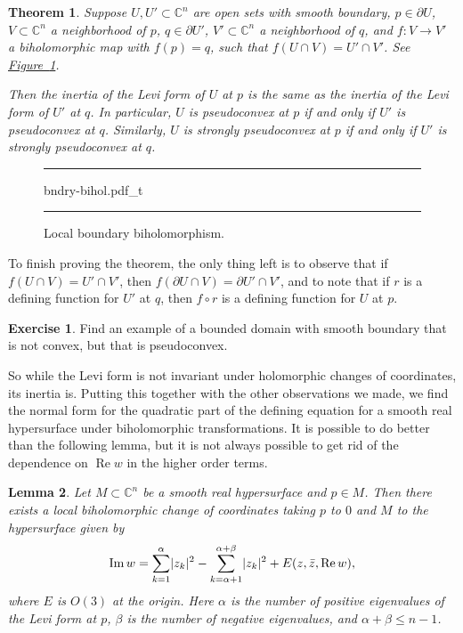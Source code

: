 \documentclass[12pt,openany]{book}
\newcommand{\avoidbreak}{\postdisplaypenalty=100}
\renewcommand{\Re}{\operatorname{Re}}
\renewcommand{\Im}{\operatorname{Im}}
\newcommand{\sabs}[1]{\lvert {#1} \rvert}
\newcommand{\C}{{\mathbb{C}}}
\theoremstyle{plain}
\newtheorem{thm}{Theorem}[section]
\newtheorem{lemma}[thm]{Lemma}
\theoremstyle{remark}
\theoremstyle{definition}
\newenvironment{exbox}{%
    \def\FrameCommand{\vrule width 1pt \relax\hspace{10pt}}%
    \MakeFramed{\advance\hsize-\width\FrameRestore}%
}{%
    \endMakeFramed
}
\newenvironment{myfig}{%
\begin{figure}[h!t]
\noindent\rule{\textwidth}{0.5pt}\vspace{12pt}\par\centering}%
{\par\noindent\rule{\textwidth}{0.5pt}
\end{figure}}
\theoremstyle{exercise}
\newtheorem{exercise}{Exercise}[section]
\theoremstyle{example}
\newcommand{\figureref}[1]{\hyperref[#1]{Figure~\ref*{#1}}}
\begin{document}
\begin{thm}
\pagebreak[2]
Suppose $U, U' \subset \C^n$ are open sets with smooth boundary,
$p \in \partial U$, $V \subset \C^n$ a neighborhood of $p$,
$q \in \partial U'$, $V' \subset \C^n$ a neighborhood of $q$,
and $f \colon V \to V'$ a biholomorphic map with $f(p) = q$, such that
$f(U \cap V) = U' \cap V'$.
See \figureref{fig:bndry-bihol}.

Then the inertia of the Levi form of $U$ at $p$ is the same as the inertia of
the Levi form of $U'$ at $q$.
In particular, $U$ is pseudoconvex at $p$ if and only if $U'$ is pseudoconvex at $q$.
Similarly,
$U$ is strongly pseudoconvex at $p$ if and only if $U'$ is strongly pseudoconvex at $q$.
\end{thm}

\begin{myfig}
{bndry-bihol.pdf_t}
\caption{Local boundary biholomorphism.\label{fig:bndry-bihol}}
\end{myfig}

To finish proving the theorem, the only thing left is to observe that if
$f(U \cap V) = U' \cap V'$, then $f(\partial U \cap V) = \partial U' \cap
V'$, and to note that if $r$ is a defining function for $U'$ at $q$,
then $f \circ r$ is a defining function for $U$ at $p$.

\begin{exbox}
\begin{exercise}
Find an example of a bounded domain with smooth boundary that is not convex,
but that is pseudoconvex.
\end{exercise}
\end{exbox}

So while the Levi form is not invariant under holomorphic changes of coordinates,
its inertia is.
Putting this together with the other observations we made,
we find the normal form for the
quadratic part of the defining equation for a smooth real hypersurface
under biholomorphic transformations.
It is possible to do better than the following lemma, but it is not always possible
to get rid of the dependence on $\Re w$ in the higher order terms.

\begin{lemma} \label{lemma:normformquad}
Let $M \subset \C^n$ be a smooth real hypersurface and $p \in M$.  Then there
exists a local biholomorphic change of coordinates taking $p$ to $0$
and $M$ to the hypersurface given by
\begin{equation*}
\Im w = \sum_{k=1}^\alpha \sabs{z_k}^2 - \sum_{k=\alpha+1}^{\alpha+\beta}
\sabs{z_k}^2 +
E(z,\bar{z},\Re w) ,
\avoidbreak
\end{equation*}
where $E$ is $O(3)$ at the origin.
Here $\alpha$ is the number of positive eigenvalues of the Levi form at $p$,
$\beta$ is the number of negative eigenvalues, and $\alpha+\beta \leq n-1$.
\end{lemma}
\end{document}
